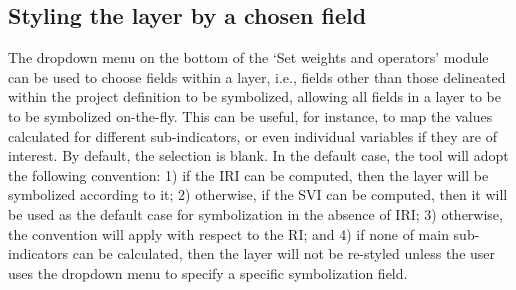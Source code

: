 \subsection{Styling the layer by a chosen field}

The dropdown menu on the bottom of the `Set weights and operators' module can
be used to choose fields within a layer, i.e., fields other than those
delineated within the project definition to be symbolized, allowing all fields
in a layer to be to be symbolized on-the-fly.  This can be useful, for
instance, to map the values calculated for different sub-indicators, or even
individual variables if they are of interest. By default, the selection is
blank. In the default case, the tool will adopt the following convention: 1) if
the IRI can be computed, then the layer will be symbolized according to it; 2)
otherwise, if the SVI can be computed, then it will be used as the default case
for symbolization in the absence of IRI; 3) otherwise, the convention will
apply with respect to the RI; and 4) if none of main sub-indicators can be
calculated, then the layer will not be re-styled unless the user uses the
dropdown menu to specify a specific symbolization field.
